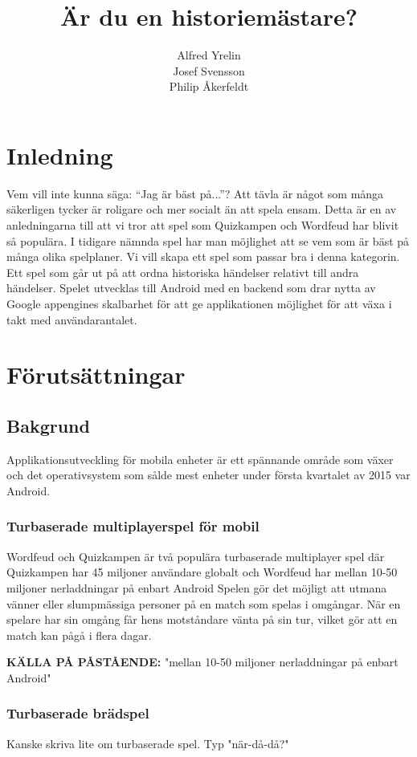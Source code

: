\documentclass[12pt,a4paper]{article}
\author{Alfred Yrelin\\Josef Svensson\\Philip Åkerfeldt}
\title{Är du en historiemästare?}
\begin{document}
\maketitle
\newpage
\tableofcontents
\pagebreak

\section{Inledning}
Vem vill inte kunna säga: ``Jag är bäst på...''? Att tävla är något som många säkerligen tycker är roligare och mer socialt än att spela ensam. Detta är en av anledningarna till att vi tror att spel som Quizkampen och Wordfeud har blivit så populära\cite{quiz}. I tidigare nämnda spel har man möjlighet att se vem som är bäst på många olika spelplaner. Vi vill skapa ett spel som passar bra i denna kategorin. Ett spel som går ut på att ordna historiska händelser relativt till andra händelser. Spelet utvecklas till Android med en backend som drar nytta av Google appengines skalbarhet för att ge applikationen möjlighet för att växa i takt med användarantalet. 

\section{Förutsättningar}

\subsection{Bakgrund}
Applikationsutveckling för mobila enheter är ett spännande område som växer\cite{trendforce} och det operativsystem som sålde mest enheter under första kvartalet av 2015 var Android. 

\subsubsection{Turbaserade multiplayerspel för mobil}
Wordfeud och Quizkampen är två populära turbaserade multiplayer spel där Quizkampen har 45 miljoner användare globalt\cite{quiz} och Wordfeud har mellan 10-50 miljoner nerladdningar på enbart Android Spelen gör det möjligt att utmana vänner eller slumpmässiga personer på en match som spelas i omgångar. När en spelare har sin omgång får hens motståndare vänta på sin tur, vilket gör att en match kan pågå i flera dagar.

\textbf{KÄLLA PÅ PÅSTÅENDE:} "mellan 10-50 miljoner nerladdningar på enbart Android"

\subsubsection{Turbaserade brädspel}
Kanske skriva lite om turbaserade spel. Typ "när-då-då?"
\end{document}
